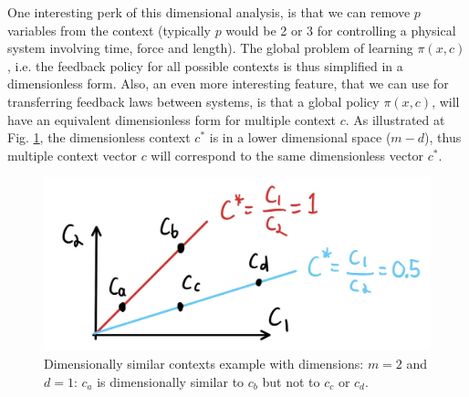 One interesting perk of this dimensional analysis, is that we can remove $p$ variables from the context (typically $p$ would be 2 or 3 for controlling a physical system involving time, force and length). The global problem of learning $\pi(x,c)$, i.e. the feedback policy for all possible contexts is thus simplified in a dimensionless form. Also, an even more interesting feature, that we can use for transferring feedback laws between systems, is that a global policy $\pi( x , c )$, will have an equivalent dimensionless form for multiple context $c$. As illustrated at Fig. \ref{fig:c_space}, the dimensionless context $c^*$ is in a lower dimensional space ($m-d$), thus multiple context vector $c$ will correspond to the same dimensionless vector $c^*$. 
\begin{figure}[ht]
\vspace{-5pt}
\begin{center}
\includegraphics[width=0.90\linewidth]{fig/c_space2.jpg}
\caption{Dimensionally similar contexts example with dimensions: $m=2$ and $d=1$: $c_a$ is dimensionally similar to $c_b$ but not to $c_c$ or $c_d$.}\label{fig:c_space}
\end{center}
\vspace{-15pt}
\end{figure}


